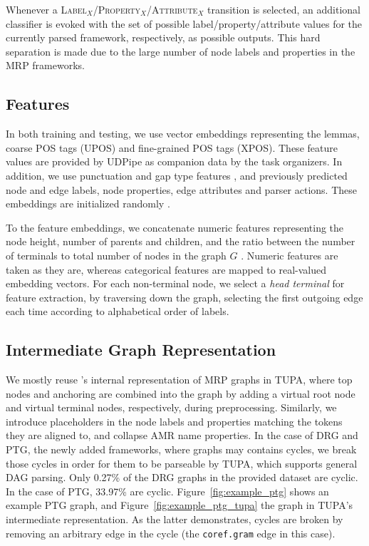 \documentclass[11pt,a4paper]{article}
\begin{document}
Whenever a \textsc{Label$_X$}/\textsc{Property$_X$}/\textsc{Attribute$_X$} transition is selected, an additional classifier is evoked with the set of possible label/property/attribute values for the currently parsed framework, respectively, as possible outputs. This hard separation is made due to the large number of node labels and properties in the MRP frameworks.

\subsection{Features}\label{sec:tupa-features}

In both training and testing, we use vector embeddings representing the lemmas, coarse POS tags (UPOS) and fine-grained POS tags (XPOS). These feature values are provided by UDPipe as companion data by the task organizers. In addition, we use punctuation and gap type features \cite{maier-lichte:2016:DiscoNLP}, and previously predicted node and edge labels, node properties, edge attributes and parser actions. These embeddings are initialized randomly \cite{glorot2010understanding}.

To the feature embeddings, we concatenate numeric features representing the node height, number of parents and children, and the ratio between the number of terminals to total number of nodes in the graph $G$ \cite{hershcovich2017a}. Numeric features are taken as they are, whereas categorical features are mapped to real-valued embedding vectors. For each non-terminal node, we select a \textit{head terminal} for feature extraction, by traversing down the graph, selecting the first outgoing edge each time according to alphabetical order of labels.

\subsection{Intermediate Graph Representation}\label{sec:tupa-format}

We mostly reuse 's
internal representation of MRP graphs in TUPA,
where top nodes and anchoring are combined into the graph by adding a virtual root node
and virtual terminal nodes, respectively, during preprocessing.
Similarly, we introduce placeholders in the node labels and properties matching the tokens they are aligned to,
and collapse AMR name properties.
In the case of DRG and PTG, the newly added frameworks, where graphs may contains cycles, we break those cycles in order for them to be parseable by TUPA, which supports general DAG parsing. Only 0.27\% of the DRG graphs in the provided dataset are cyclic. In the case of PTG, 33.97\% are cyclic.
Figure~\ref{fig:example_ptg} shows an example PTG graph, and Figure~\ref{fig:example_ptg_tupa} the graph in TUPA's intermediate representation.
As the latter demonstrates, cycles are broken by removing an arbitrary edge in the cycle (the \texttt{coref.gram} edge in this case).
\end{document}
